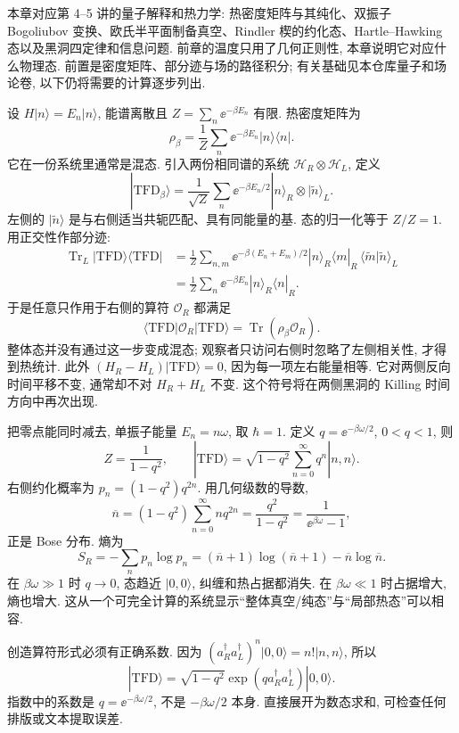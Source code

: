 \label{ch:holo-quantum-thermal-full}
本章对应第 4--5 讲的量子解释和热力学: 热密度矩阵与其纯化、双振子 Bogoliubov 变换、欧氏半平面制备真空、Rindler 楔的约化态、Hartle--Hawking 态以及黑洞四定律和信息问题. 前章的温度只用了几何正则性, 本章说明它对应什么物理态. 前置是密度矩阵、部分迹与场的路径积分; 有关基础见本仓库量子和场论卷, 以下仍将需要的计算逐步列出.

设 $H|n\rangle=E_n|n\rangle$, 能谱离散且 $Z=\sum_n\ee^{-\beta E_n}$ 有限. 热密度矩阵为
\[
\rho_\beta=\frac1Z\sum_n\ee^{-\beta E_n}|n\rangle\langle n|.
\]
它在一份系统里通常是混态. 引入两份相同谱的系统 $\mathcal H_R\otimes\mathcal H_L$, 定义
\[
|\mathrm{TFD}_\beta\rangle=
\frac1{\sqrt Z}\sum_n\ee^{-\beta E_n/2}
|n\rangle_R\otimes|\widetilde n\rangle_L.
\]
左侧的 $|\widetilde n\rangle$ 是与右侧适当共轭匹配、具有同能量的基. 态的归一化等于 $Z/Z=1$. 用正交性作部分迹:
\begin{align*}
\operatorname{Tr}_L|\mathrm{TFD}\rangle\langle\mathrm{TFD}|
&=\frac1Z\sum_{n,m}\ee^{-\beta(E_n+E_m)/2}
|n\rangle_R\langle m|_R\,
\langle\widetilde m|\widetilde n\rangle_L\\
&=\frac1Z\sum_n\ee^{-\beta E_n}|n\rangle_R\langle n|_R.
\end{align*}
于是任意只作用于右侧的算符 $\mathcal O_R$ 都满足
\[
\langle\mathrm{TFD}|\mathcal O_R|\mathrm{TFD}\rangle
=\operatorname{Tr}(\rho_\beta\mathcal O_R).
\]
整体态并没有通过这一步变成混态; 观察者只访问右侧时忽略了左侧相关性, 才得到热统计. 此外 $(H_R-H_L)|\mathrm{TFD}\rangle=0$, 因为每一项左右能量相等. 它对两侧反向时间平移不变, 通常却不对 $H_R+H_L$ 不变. 这个符号将在两侧黑洞的 Killing 时间方向中再次出现.

把零点能同时减去, 单振子能量 $E_n=n\omega$, 取 $\hbar=1$. 定义 $q=\ee^{-\beta\omega/2}$, $0<q<1$, 则
\[
Z=\frac1{1-q^2},\qquad
|\mathrm{TFD}\rangle=\sqrt{1-q^2}\sum_{n=0}^\infty q^n|n,n\rangle.
\]
右侧约化概率为 $p_n=(1-q^2)q^{2n}$. 用几何级数的导数,
\[
\overline n=(1-q^2)\sum_{n=0}^\infty nq^{2n}
=\frac{q^2}{1-q^2}=\frac1{\ee^{\beta\omega}-1},
\]
正是 Bose 分布. 熵为
\[
S_R=-\sum_np_n\log p_n
=(\overline n+1)\log(\overline n+1)-\overline n\log\overline n.
\]
在 $\beta\omega\gg1$ 时 $q\to0$, 态趋近 $|0,0\rangle$, 纠缠和热占据都消失. 在 $\beta\omega\ll1$ 时占据增大, 熵也增大. 这从一个可完全计算的系统显示“整体真空/纯态”与“局部热态”可以相容.

创造算符形式必须有正确系数. 因为 $(a_R^\dagger a_L^\dagger)^n|0,0\rangle=n!|n,n\rangle$, 所以
\[
|\mathrm{TFD}\rangle=\sqrt{1-q^2}
\exp(q a_R^\dagger a_L^\dagger)|0,0\rangle.
\]
指数中的系数是 $q=\ee^{-\beta\omega/2}$, 不是 $-\beta\omega/2$ 本身. 直接展开为数态求和, 可检查任何排版或文本提取误差.

